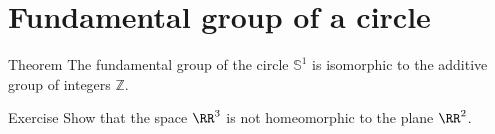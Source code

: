 \chapter{Fundamental group of a circle}

\begin{thm}{Theorem}
The fundamental group of the circle $\mathbb{S}^1$ is isomorphic to the additive group of integers $\mathbb{Z}$.
\end{thm}


\begin{thm}{Exercise}
Show that the space $\RR^3$ is not homeomorphic to the plane $\RR^2$.
\end{thm}

